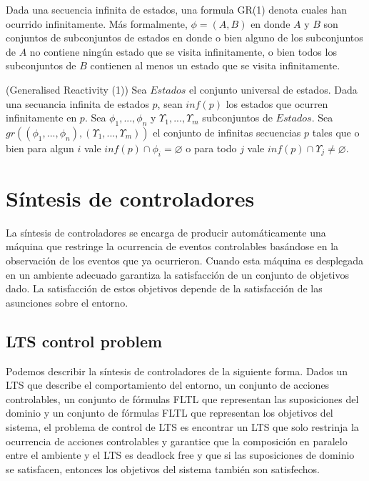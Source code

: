 Dada una secuencia infinita de estados, una formula GR(1) denota cuales han ocurrido infinitamente. 
Más formalmente, $\phi = (A, B)$ en donde $A$ y $B$ son conjuntos de subconjuntos de estados en donde o bien alguno de los
subconjuntos de $A$ no contiene ningún estado que se visita infinitamente, o bien todos los subconjuntos de $B$ contienen 
al menos un estado que se visita infinitamente.

\begin{definition}{(Generalised Reactivity (1))}
Sea $Estados$ el conjunto universal de estados. Dada una secuancia infinita de estados $p$, sean $inf(p)$ los estados que
ocurren infinitamente en $p$. Sea $\phi_{1}, ..., \phi_{n}$ y $\varUpsilon_{1}, ..., \varUpsilon_{m}$ subconjuntos de $Estados$. Sea\\
$gr((\phi_{1}, ..., \phi_{n}), (\varUpsilon_{1}, ..., \varUpsilon_{m}))$ el conjunto de infinitas secuencias $p$ tales que
o bien para algun $i$ vale $inf(p)\cap\phi_{i} = \varnothing$ o para todo $j$ vale $inf(p)\cap\varUpsilon_{j} \neq \varnothing$.
\end{definition}

\section{Síntesis de controladores}

La síntesis de controladores se encarga de producir automáticamente una máquina que restringe la ocurrencia de eventos
controlables basándose en la observación de los eventos que ya ocurrieron. Cuando esta máquina es desplegada en un ambiente
adecuado garantiza la satisfacción de un conjunto de objetivos dado. La satisfacción de estos objetivos depende de la
satisfacción de las asunciones sobre el entorno.

\subsection{LTS control problem}

Podemos describir la síntesis de controladores de la siguiente forma. Dados un LTS que describe el comportamiento
del entorno, un conjunto de acciones controlables, un conjunto de fórmulas FLTL que representan las suposiciones
del dominio y un conjunto de fórmulas FLTL que representan los objetivos del sistema, el problema de control de
LTS \cite{LTSControl} es encontrar un LTS que solo restrinja la ocurrencia de acciones controlables y garantice que la composición
en paralelo entre el ambiente y el LTS es deadlock free y que si las suposiciones de dominio se satisfacen, entonces
los objetivos del sistema también son satisfechos.

